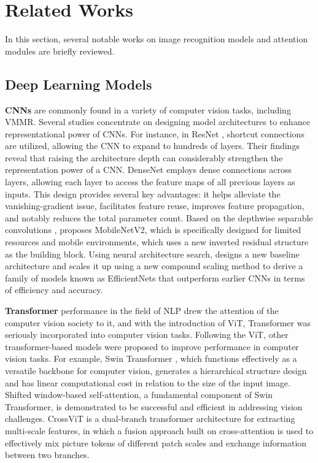 \section{Related Works}
In this section, several notable works on image recognition models and attention modules are briefly reviewed.

\subsection{Deep Learning Models}
\textbf{CNNs} are commonly found in a variety of computer vision tasks, including VMMR. Several studies concentrate on designing model architectures to enhance representational power of CNNs. For instance, in ResNet \cite{he2016deep}, shortcut connections are utilized, allowing the CNN to expand to hundreds of layers. Their findings reveal that raising the architecture depth can considerably strengthen the representation power of a CNN. DenseNet \cite{huang2017densely} employs dense connections across layers, allowing each layer to access the feature maps of all previous layers as inputs. This design provides several key advantages: it helps alleviate the vanishing-gradient issue, facilitates feature reuse, improves feature propagation, and notably reduces the total parameter count. Based on the depthwise separable convolutions \cite{sandler2018mobilenetv2}, proposes MobileNetV2, which is specifically designed for limited resources and mobile environments, which uses a new inverted residual structure as the building block. Using neural architecture search, \cite{tan2019efficientnet} designs a new baseline architecture and scales it up using a new compound scaling method to derive a family of models known as EfficientNets that outperform earlier CNNs in terms of efficiency and accuracy.

\textbf{Transformer} performance in the field of NLP drew the attention of the computer vision society to it, and with the introduction of ViT, Transformer was seriously incorporated into computer vision tasks. Following the ViT, other transformer-based models were proposed to improve performance in computer vision tasks. For example, Swin Transformer \cite{liu2021swin}, which functions effectively as a versatile backbone for computer vision, generates a hierarchical structure design and has linear computational cost in relation to the size of the input image. Shifted window-based self-attention, a fundamental component of Swin Transformer, is demonstrated to be successful and efficient in addressing vision challenges. CrossViT \cite{chen2021crossvit} is a dual-branch transformer architecture for extracting multi-scale features, in which a fusion approach built on cross-attention is used to effectively mix picture tokens of different patch scales and exchange information between two branches.

